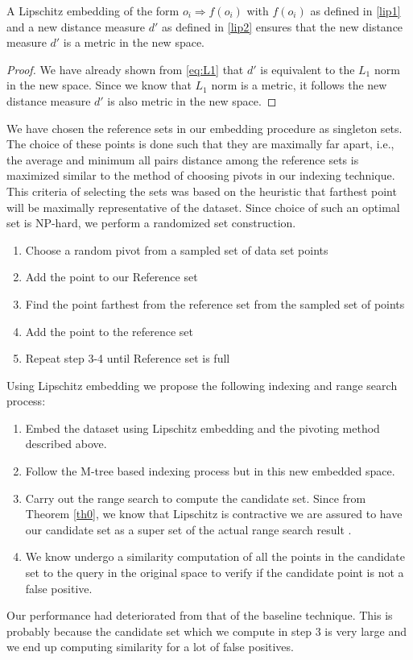\begin{thm}
A Lipschitz embedding of the form $o_i \Rightarrow f(o_i)$ with $f(o_i)$ as defined in \autoref{lip1} and a new distance measure $d'$ as defined in \autoref{lip2} ensures that the new distance measure $d'$ is a metric in the new space.
\end{thm}

\begin{proof}
We have already shown from \autoref{eq:L1} that $d'$ is equivalent to the $L_1$ norm in the new space. Since we know that $L_1$ norm is a metric, it follows the new distance measure $d'$ is also metric in the new space.
\end{proof}

We have chosen the reference sets in our embedding procedure as singleton sets. The choice of these points is done such that they are maximally far apart, i.e., the average and minimum all pairs distance among the reference sets is maximized similar to the method of choosing pivots in our indexing technique. This criteria of selecting the sets was based on the heuristic that farthest point will be maximally representative of the dataset. Since choice of such an optimal set is NP-hard, we perform a randomized set construction.\\

\begin{enumerate}
	\item Choose a random pivot from a sampled set of  data set points

	\item Add the point to our Reference set

	\item Find the point farthest from the reference set from the sampled set of points

	\item Add the point to the reference set

	\item Repeat step 3-4 until Reference set is full\\
\end{enumerate}


Using Lipschitz embedding we propose the following indexing and range search process:
\begin{enumerate}
	\item Embed the dataset using Lipschitz embedding and the pivoting method described above.
	\item Follow the M-tree based indexing process but in this new embedded space.
	\item Carry out the range search to compute the candidate set.  Since from Theorem \autoref{th0}, we know that Lipschitz is contractive we are assured to have our candidate set as a super set of the actual range search result .
	\item We know undergo a similarity computation of all the points in the candidate set to the query in the original space to verify if the candidate point is not a false positive.
\end{enumerate}
Our performance had deteriorated from that of the baseline technique. This is probably because the candidate set which we compute in step 3 is very large and we end up computing similarity for a lot of false positives.
